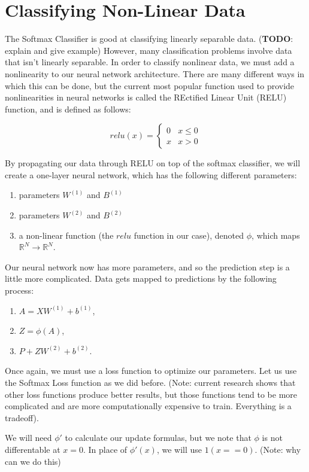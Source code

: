 \newpage
\section{Classifying Non-Linear Data}
The Softmax Classifier is good at classifying linearly separable data.
(\textbf{TODO}: explain and give example)
However, many classification problems involve data that isn't linearly
separable. In order to classify nonlinear data, we must add a nonlinearity to
our neural network architecture. There are many different ways in which this
can be done, but the current most popular function used to provide
nonlinearities in neural networks is called the REctified Linear Unit (RELU)
function, and is defined as follows:

\[ relu(x) = \begin{cases} 
      0 & x\leq 0 \\
      x & x > 0 
   \end{cases}
\]

By propagating our data through RELU on top of the softmax classifier, we will
create a one-layer neural network, which has the following different
parameters:
\begin{enumerate}
\item parameters $W^{(1)}$ and $B^{(1)}$
\item parameters $W^{(2)}$ and $B^{(2)}$ \item a non-linear function (the
$relu$ function in our case), denoted $\phi$, which maps $\mathbb{R}^N
\longrightarrow \mathbb{R}^N$.
\end{enumerate}

Our neural network now has more parameters, and so the prediction step is a
little more complicated. Data gets mapped to predictions by the following
process:
\begin{enumerate}
\item $A = XW^{(1)} + b^{(1)}$,
\item $Z = \phi(A)$,
\item $P + ZW^{(2)} + b^{(2)}$.
\end{enumerate}

Once again, we must use a loss function to optimize our parameters. Let us use
the Softmax Loss function as we did before. (Note: current research shows that
other loss functions produce better results, but those functions tend to be
more complicated and are more computationally expensive to train. Everything is
a tradeoff).

We will need $\phi'$ to calculate our update formulas, but we note that
$\phi$ is not differentable at $x=0$. In place of $\phi'(x)$, we will use
$1(x == 0)$. (Note: why can we do this)


